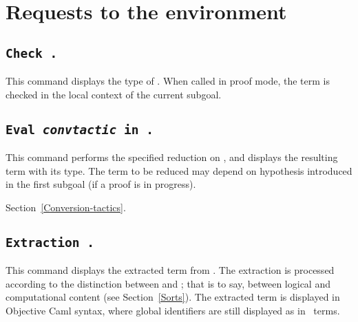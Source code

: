 
\section{Requests to the environment}

\subsection[\tt Check {\term}.]{\tt Check {\term}.\label{Check}
}
This command displays the type of {\term}. When called in proof mode, 
the term is checked in the local context of the current subgoal.

\subsection[\tt Eval {\rm\sl convtactic} in {\term}.]{\tt Eval {\rm\sl convtactic} in {\term}.}

This command performs the specified reduction on {\term}, and displays
the resulting term with its type. The term to be reduced may depend on
hypothesis introduced in the first subgoal (if a proof is in
progress).

\SeeAlso Section~\ref{Conversion-tactics}.

\subsection[\tt Extraction \term.]{\tt Extraction \term.\label{ExtractionTerm}
} 
This command displays the extracted term from
{\term}. The extraction is processed according to the distinction
between {\Set} and {\Prop}; that is to say, between logical and
computational content (see Section~\ref{Sorts}). The extracted term is
displayed in Objective Caml syntax, where global identifiers are still
displayed as in \Coq\ terms.

